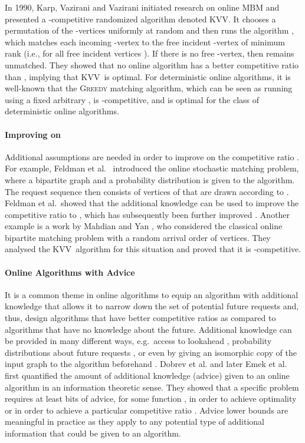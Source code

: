 \documentclass[a4paper]{article}
\newcommand{\KVV}{\textsc{KVV}}
\begin{document}
In 1990, Karp, Vazirani and Vazirani \cite{kvv90} initiated research on
online \textsc{MBM} and presented a -competitive randomized algorithm denoted \KVV. It chooses
a permutation  of the -vertices uniformly at random and then runs
the algorithm ,
which matches each incoming -vertex  to the free incident -vertex  of minimum rank
(i.e.,  for all free incident vertices ).
If there is no free -vertex, then  remains unmatched.
They showed that no online algorithm has a better competitive ratio than , implying
that \KVV~is optimal.
For deterministic online algorithms, it is well-known that the \textsc{Greedy} matching algorithm,
which can be seen as running  using a fixed arbitrary , is -competitive,
and is optimal for the class of deterministic online algorithms.

\paragraph*{Improving on } Additional assumptions are needed in order to improve on the
competitive ratio . For example, Feldman et al.~\cite{fmmm09} introduced the online stochastic matching
problem, where a bipartite graph  and a probability distribution  is
given to the algorithm. The request sequence then consists of vertices of  that are
drawn according to . Feldman et al.\ showed that the additional knowledge can be used to
improve the competitive ratio to , which has subsequently
been further improved \cite{bk10,mgs11}. Another example is a work by Mahdian and Yan \cite{my11}, who considered
the classical online bipartite matching problem with a random arrival order of vertices. They analysed the
\textsc{KVV}~algorithm for this situation and proved that it is -competitive.

\paragraph*{Online Algorithms with Advice}
It is a common theme in online algorithms to equip an algorithm with additional knowledge that
allows it to narrow down the set of potential future requests and, thus, design algorithms that have
better competitive ratios as compared to algorithms that have no knowledge about the future. Additional
knowledge can be provided in many different ways, e.g.\ access to lookahead \cite{hs92,g95}, probability
distributions about future requests \cite{fmmm09,my11},
or even by giving an isomorphic copy of the
input graph to the algorithm beforehand \cite{h99}. Dobrev et al. \cite{DRP2008} and later Emek et al. \cite{efkr11} first quantified
the amount of additional knowledge (advice) given to an online algorithm in an information theoretic sense.
They showed that a specific problem requires at least  bits of advice, for some function , in order
to achieve optimality  \cite{DRP2008} or in order to achieve a particular competitive ratio \cite{efkr11}.
Advice lower bounds are meaningful in practice as they apply to any potential type of
additional information that could be given to an algorithm.
\end{document}
